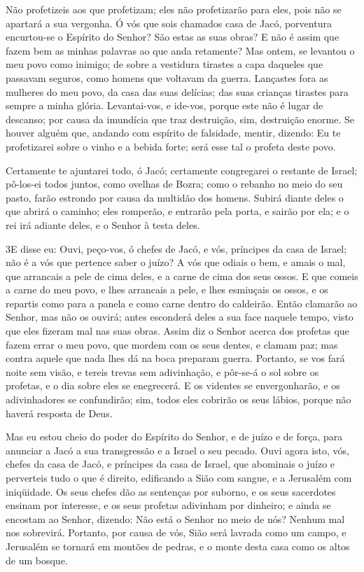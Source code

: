 Não profetizeis aos que profetizam; eles não profetizarão para
eles, pois não se apartará a sua vergonha. Ó vós que sois
chamados casa de Jacó, porventura encurtou-se o Espírito do Senhor?
São estas as suas obras? E não é assim que fazem bem as minhas
palavras ao que anda retamente? Mas ontem, se levantou o meu
povo como inimigo; de sobre a vestidura tirastes a capa daqueles que
passavam seguros, como homens que voltavam da guerra. Lançastes
fora as mulheres do meu povo, da casa das suas delícias; das suas
crianças tirastes para sempre a minha glória. Levantai-vos, e
ide-vos, porque este não é lugar de descanso; por causa da imundícia
que traz destruição, sim, destruição enorme. Se houver alguém
que, andando com espírito de falsidade, mentir, dizendo: Eu te
profetizarei sobre o vinho e a bebida forte; será esse tal o profeta
deste povo.

Certamente te ajuntarei todo, ó Jacó; certamente congregarei o
restante de Israel; pô-los-ei todos juntos, como ovelhas de Bozra;
como o rebanho no meio do seu pasto, farão estrondo por causa da
multidão dos homens. Subirá diante deles o que abrirá o
caminho; eles romperão, e entrarão pela porta, e sairão por ela; e o
rei irá adiante deles, e o Senhor à testa deles.

\medskip

\lettrine{3} E disse eu: Ouvi, peço-vos, ó chefes de Jacó, e
vós, príncipes da casa de Israel; não é a vós que pertence saber o
juízo? A vós que odiais o bem, e amais o mal, que arrancais a
pele de cima deles, e a carne de cima dos seus ossos. E que
comeis a carne do meu povo, e lhes arrancais a pele, e lhes
esmiuçais os ossos, e os repartis como para a panela e como carne
dentro do caldeirão. Então clamarão ao Senhor, mas não os
ouvirá; antes esconderá deles a sua face naquele tempo, visto que
eles fizeram mal nas suas obras. Assim diz o Senhor acerca dos
profetas que fazem errar o meu povo, que mordem com os seus dentes,
e clamam paz; mas contra aquele que nada lhes dá na boca preparam
guerra. Portanto, se vos fará noite sem visão, e tereis trevas
sem adivinhação, e pôr-se-á o sol sobre os profetas, e o dia sobre
eles se enegrecerá. E os videntes se envergonharão, e os
adivinhadores se confundirão; sim, todos eles cobrirão os seus
lábios, porque não haverá resposta de Deus.

Mas eu estou cheio do poder do Espírito do Senhor, e de juízo e de
força, para anunciar a Jacó a sua transgressão e a Israel o seu
pecado. Ouvi agora isto, vós, chefes da casa de Jacó, e
príncipes da casa de Israel, que abominais o juízo e perverteis tudo
o que é direito, edificando a Sião com sangue, e a Jerusalém
com iniqüidade. Os seus chefes dão as sentenças por suborno,
e os seus sacerdotes ensinam por interesse, e os seus profetas
adivinham por dinheiro; e ainda se encostam ao Senhor, dizendo: Não
está o Senhor no meio de nós? Nenhum mal nos sobrevirá.
Portanto, por causa de vós, Sião será lavrada como um campo,
e Jerusalém se tornará em montões de pedras, e o monte desta casa
como os altos de um bosque.


